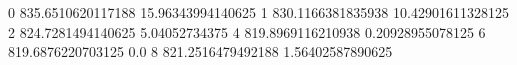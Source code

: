 0 835.6510620117188 15.96343994140625
1 830.1166381835938 10.42901611328125
2 824.7281494140625 5.04052734375
4 819.8969116210938 0.20928955078125
6 819.6876220703125 0.0
8 821.2516479492188 1.56402587890625
